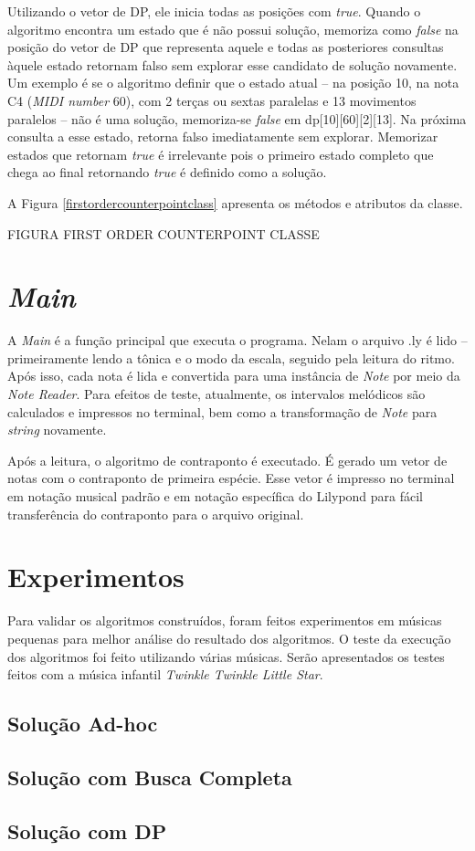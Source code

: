       Utilizando o vetor de DP, ele inicia todas as posições com \textit{true}. Quando o algoritmo encontra um estado que é não possui solução, memoriza como \textit{false} na posição do vetor de DP que representa aquele e todas as posteriores consultas àquele estado retornam falso sem explorar esse candidato de solução novamente. Um exemplo é se o algoritmo definir que o estado atual -- na posição 10, na nota C4 (\textit{MIDI number} 60), com 2 terças ou sextas paralelas e 13 movimentos paralelos -- não é uma solução, memoriza-se \textit{false} em dp[10][60][2][13]. Na próxima consulta a esse estado, retorna falso imediatamente sem explorar. Memorizar estados que retornam \textit{true} é irrelevante pois o primeiro estado completo que chega ao final retornando \textit{true} é definido como a solução.

      A Figura \ref{firstordercounterpointclass} apresenta os métodos e atributos da classe.

      FIGURA FIRST ORDER COUNTERPOINT CLASSE


  \section[\textit{Main}]{\textit{Main}}

    A \textit{Main} é a função principal que executa o programa. Nelam o arquivo .ly é lido -- primeiramente lendo a tônica e o modo da escala, seguido pela leitura do ritmo. Após isso, cada nota é lida e convertida para uma instância de \textit{Note} por meio da \textit{Note Reader}. Para efeitos de teste, atualmente, os intervalos melódicos são calculados e impressos no terminal, bem como a transformação de \textit{Note} para \textit{string} novamente.

    Após a leitura, o algoritmo de contraponto é executado. É gerado um vetor de notas com o contraponto de primeira espécie. Esse vetor é impresso no terminal em notação musical padrão e em notação específica do Lilypond para fácil transferência do contraponto para o arquivo original.

  \section[Experimentos]{Experimentos}

    Para validar os algoritmos construídos, foram feitos experimentos em músicas pequenas para melhor análise do resultado dos algoritmos. O teste da execução dos algoritmos foi feito utilizando várias músicas. Serão apresentados os testes feitos com a música infantil \textit{Twinkle Twinkle Little Star}.

    \subsection[\textit{Solução Ad-hoc}]{Solução Ad-hoc}
    \subsection[\textit{Solução com Busca Completa}]{Solução com Busca Completa}
    \subsection[\textit{Solução com DP}]{Solução com DP}
